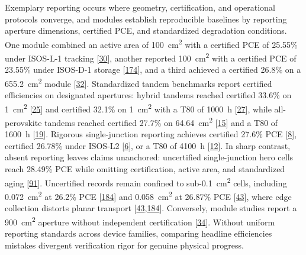 \documentclass[
  11pt,
]{article}
\begin{document}
Exemplary reporting occurs where geometry, certification, and
operational protocols converge, and modules establish reproducible
baselines by reporting aperture dimensions, certified PCE, and
standardized degradation conditions. One module combined an active area
of \qty{100}{\centi\meter\squared} with a certified PCE of 25.55\% under
ISOS-L-1 tracking
{[}\href{https://doi.org/10.1126/sciadv.aec3238}{30}{]}, another
reported \qty{100}{\centi\meter\squared} with a certified PCE of 23.55\%
under ISOS-D-1 storage
{[}\href{https://doi.org/10.1038/s41467-026-69685-6}{174}{]}, and a
third achieved a certified 26.8\% on a \qty{655.2}{\centi\meter\squared}
module {[}\href{https://doi.org/10.1002/adma.73855}{32}{]}. Standardized
tandem benchmarks report certified efficiencies on designated apertures:
hybrid tandems reached certified 33.6\% on \qty{1}{\centi\meter\squared}
{[}\href{https://doi.org/10.1126/science.aef5355}{25}{]} and certified
32.1\% on \qty{1}{\centi\meter\squared} with a T80 of \qty{1000}{\hour}
{[}\href{https://doi.org/10.1002/anie.5162616}{27}{]}, while
all-perovskite tandems reached certified 27.7\% on
\qty{64.64}{\centi\meter\squared}
{[}\href{https://doi.org/10.1038/s41467-026-70848-8}{15}{]} and a T80 of
\qty{1600}{\hour} {[}\href{https://doi.org/10.1002/pip.70077}{19}{]}.
Rigorous single-junction reporting achieves certified 27.6\% PCE
{[}\href{https://doi.org/10.1126/science.aeb9953}{8}{]}, certified
26.78\% under ISOS-L2
{[}\href{https://doi.org/10.1002/adma.202520432}{6}{]}, or a T80 of
\qty{4100}{\hour} {[}\href{https://doi.org/10.1002/adfm.76110}{12}{]}.
In sharp contrast, absent reporting leaves claims unanchored:
uncertified single-junction hero cells reach 28.49\% PCE while omitting
certification, active area, and standardized aging
{[}\href{https://doi.org/10.1007/s40820-025-02006-6}{91}{]}. Uncertified
records remain confined to sub-\qty{0.1}{\centi\meter\squared} cells,
including \qty{0.072}{\centi\meter\squared} at 26.2\% PCE
{[}\href{https://doi.org/10.1038/s41467-025-68207-0}{184}{]} and
\qty{0.058}{\centi\meter\squared} at 26.87\% PCE
{[}\href{https://doi.org/10.1002/aenm.70925}{43}{]}, where edge
collection distorts planar transport
{[}\href{https://doi.org/10.1002/aenm.70925}{43},\href{https://doi.org/10.1038/s41467-025-68207-0}{184}{]}.
Conversely, module studies report a \qty{900}{\centi\meter\squared}
aperture without independent certification
{[}\href{https://doi.org/10.1002/adfm.202532205}{34}{]}. Without uniform
reporting standards across device families, comparing headline
efficiencies mistakes divergent verification rigor for genuine physical
progress.
\end{document}
